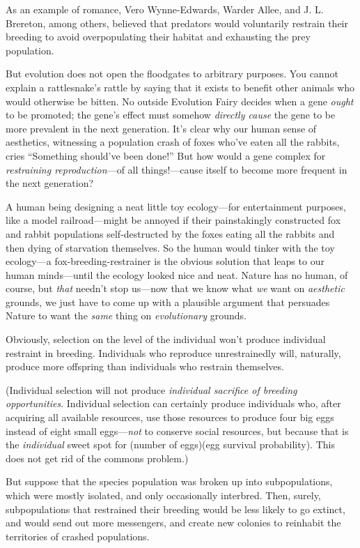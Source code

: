  As an example of romance, Vero Wynne-Edwards, Warder Allee, and J.
L. Brereton, among others, believed that predators would voluntarily
restrain their breeding to avoid overpopulating their habitat and
exhausting the prey population.


 But evolution does not open the floodgates to arbitrary purposes.
You cannot explain a rattlesnake's rattle by saying
that it exists to benefit other animals who would otherwise be bitten.
No outside Evolution Fairy decides when a gene \textit{ought} to be
promoted; the gene's effect must somehow
\textit{directly cause} the gene to be more prevalent in the next
generation. It's clear why our human sense of
aesthetics, witnessing a population crash of foxes
who've eaten all the rabbits, cries
``Something should've been
done!'' But how would a gene complex for
\textit{restraining reproduction}{}---of all things!---cause itself to
become more frequent in the next generation?


 A human being designing a neat little toy ecology---for
entertainment purposes, like a model railroad---might be annoyed if
their painstakingly constructed fox and rabbit populations
self-destructed by the foxes eating all the rabbits and then dying of
starvation themselves. So the human would tinker with the toy
ecology---a fox-breeding-restrainer is the obvious solution that leaps
to our human minds---until the ecology looked nice and neat. Nature has
no human, of course, but \textit{that} needn't stop
us---now that we know what \textit{we} want on \textit{aesthetic}
grounds, we just have to come up with a plausible argument that
persuades Nature to want the \textit{same} thing on
\textit{evolutionary} grounds.


 Obviously, selection on the level of the individual
won't produce individual restraint in breeding.
Individuals who reproduce unrestrainedly will, naturally, produce more
offspring than individuals who restrain themselves.


 (Individual selection will not produce \textit{individual
sacrifice of breeding opportunities}. Individual selection can
certainly produce individuals who, after acquiring all available
resources, use those resources to produce four big eggs instead of
eight small eggs---\textit{not} to conserve social resources, but
because that is the \textit{individual} sweet spot for (number of
eggs){\texttimes}(egg survival probability). This does not get rid of
the commons problem.)


 But suppose that the species population was broken up into
subpopulations, which were mostly isolated, and only occasionally
interbred. Then, surely, subpopulations that restrained their breeding
would be less likely to go extinct, and would send out more messengers,
and create new colonies to reinhabit the territories of crashed
populations.


